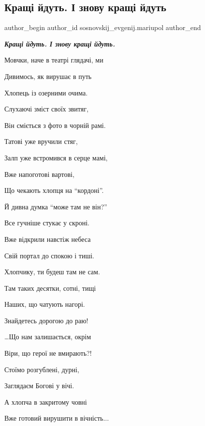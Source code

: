  
 
 
 
 

\subsection{Кращі йдуть. І знову кращі йдуть}
\label{sec:01_06_2023.fb.sosnovskij_evgenij.mariupol.1.kraschi_jdut_i_znovu_kraschi_jdut}

\ifcmt
 author_begin
   author_id sosnovskij_evgenij.mariupol
 author_end
\fi

\begin{center}
\Large\bfseries\em\color{blue}
Кращі йдуть. І знову кращі йдуть.\par
Мовчки, наче в театрі глядачі, ми\par
Дивимось, як вирушає в путь\par
Хлопець із озерними очима.\par
\par
Слухаючі зміст своїх звитяг,\par
Він сміється з фото в чорній рамі.\par
Татові уже вручили стяг,\par
Залп уже встромився в серце мамі,\par
\par
Вже напоготові вартові,\par
Що чекають хлопця на \enquote{кордоні}.\par
Й дивна думка \enquote{може там не він?}\par
Все гучніше стукає у скроні.\par
\par
Вже відкрили навстіж небеса\par
Свій портал до спокою і тиші.\par
Хлопчику, ти будеш там не сам.\par
Там таких десятки, сотні, тищі\par
\par
Наших, що чатують нагорі.\par
Знайдетесь дорогою до раю!\par
…Що нам залишається, окрім\par
Віри, що герої не вмирають?!\par
\par
Стоїмо розгублені, дурні,\par
Заглядаєм Богові у вічі.\par
А хлопча в закритому човні\par
Вже готовий вирушити в вічність...\par
\end{center}

